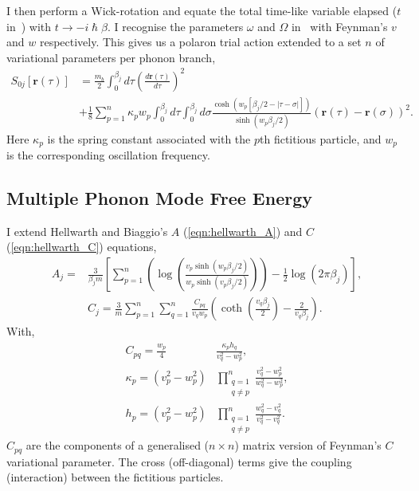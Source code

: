I then perform a Wick-rotation and equate the total time-like variable elapsed ($t$ in~\cite{poulter_complete_1992}) with $t \rightarrow -i\hslash\beta$. I recognise the parameters $\omega$ and $\Omega$ in~\cite{poulter_complete_1992} with Feynman's $v$ and $w$ respectively. This gives us a polaron trial action extended to a set $n$ of variational parameters per phonon branch,
\begin{equation} \label{eqn:multi_trial_action}
    \begin{split}
        S_{0j}[\mathbf{r}(\tau)] &=
        \frac{m_b}{2}\int^{\beta_j}_0 d\tau \left(\frac{d\mathbf{r}(\tau)}{d\tau}\right)^2 \\
        &+ \frac{1}{8} \sum_{p = 1}^n \kappa_{p} w_{p} \int^{\beta_j}_0 d\tau \int^{\beta_j}_0 d\sigma \frac{\cosh{(w_{p}[\beta_j/2-|\tau-\sigma|])}}{\sinh{(w_{p}\beta_j/2)}}(\mathbf{r}(\tau) - \mathbf{r}(\sigma))^{2} .
    \end{split}
\end{equation}
Here $\kappa_{p}$ is the spring constant associated with the $p$th fictitious particle, and $w_{p}$ is the corresponding oscillation frequency. 

\subsection{Multiple Phonon Mode Free Energy}
\label{subsec:3-1-2}

I extend Hellwarth and Biaggio's $A$ (\ref{eqn:hellwarth_A}) and $C$ (\ref{eqn:hellwarth_C}) equations, 
\begin{subequations}
\begin{align}
    A_j = &\frac{3}{\beta_j m} \left[ \sum_{p = 1}^n \left( \log\left(\frac{v_{p} \sinh (w_{p} \beta_j / 2)}{w_{p} \sinh (v_{p} \beta_j / 2)}\right) \right) - \frac{1}{2} \log \left(2\pi\beta_j\right) \right] , \label{eqn:A} \\
    &C_j = \frac{3}{m} \sum_{p = 1}^n \sum_{q = 1}^n \frac{C_{pq}}{v_{q} w_{p}} \left( \coth \left( \frac{v_{q} \beta_j}{2} \right) - \frac{2}{v_{q} \beta_j} \right) . \label{eqn:C}
\end{align}
\end{subequations}
With, 
\begin{subequations}
    \begin{align}
        C_{pq} = \frac{w_{p}}{4} &\frac{\kappa_{p} h_{q}}{v_{q}^2 - w_{p}^2} ,\\
        \kappa_{p} = \left(v_{p}^2 - w_{p}^2 \right) &\prod\limits_{\substack{q=1 \\ q\neq p}}^n \frac{v_{q}^2 - w_{p}^2}{w_{q}^2 - w_{p}^2} ,\\
        h_{p} = \left( v_{p}^2 - w_{p}^2 \right) &\prod\limits_{\substack{q=1 \\ q\neq p}}^n \frac{w_{q}^2 - v_{q}^2}{v_{q}^2 - v_{q}^2} .
    \end{align}
\end{subequations}
$C_{pq}$ are the components of a generalised ($n \times n$) matrix version of Feynman's $C$ variational parameter. The cross (off-diagonal) terms give the coupling (interaction) between the fictitious particles. 

